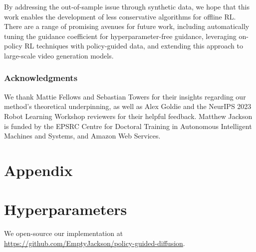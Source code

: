 \documentclass[10pt]{article} %
\theoremstyle{plain}
\theoremstyle{definition}
\theoremstyle{remark}
\begin{document}
By addressing the out-of-sample issue through synthetic data, we hope that this work enables the development of less conservative algorithms for offline RL.
There are a range of promising avenues for future work, including automatically tuning the guidance coefficient for hyperparameter-free guidance, leveraging on-policy RL techniques with policy-guided data, and extending this approach to large-scale video generation models.





\subsubsection*{Acknowledgments}
\label{sec:ack}
We thank Mattie Fellows and Sebastian Towers for their insights regarding our method's theoretical underpinning, as well as Alex Goldie and the NeurIPS 2023 Robot Learning Workshop reviewers for their helpful feedback.
Matthew Jackson is funded by the EPSRC Centre for Doctoral Training in Autonomous Intelligent Machines and Systems, and Amazon Web Services.






\clearpage
\appendix

\section*{\LARGE \centering Appendix}

\section{Hyperparameters\label{sec:all-hypers}}
We open-source our implementation at \href{https://github.com/EmptyJackson/policy-guided-diffusion}{https://github.com/EmptyJackson/policy-guided-diffusion}.
\end{document}
